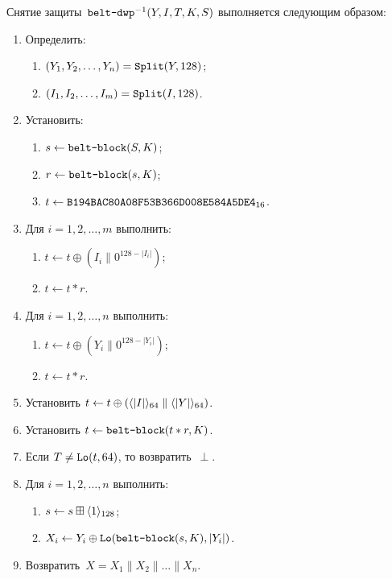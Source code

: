 Снятие защиты~$\texttt{belt-dwp}^{-1}(Y,I,T,K,S)$ выполняется следующим образом:
\begin{enumerate}
\item
Определить: 
\begin{enumerate}
\item
$(Y_1,Y_2,\ldots,Y_n)=\mathop{\texttt{Split}}\nolimits(Y, 128)$;
\item
$(I_1,I_2,\ldots,I_m)=\mathop{\texttt{Split}}\nolimits(I, 128)$. 
\end{enumerate}
\item
Установить:
\begin{enumerate}
\item
$s\leftarrow\texttt{belt-block}(S,K)$;
\item
$r\leftarrow \texttt{belt-block}(s,K)$;
\item
$t\leftarrow\texttt{B194BAC80A08F53B366D008E584A5DE4}_{16}$.
\end{enumerate}

\item
Для $i=1,2,\ldots,m$ выполнить:
\begin{enumerate}
\item
$t\leftarrow t\oplus (I_i\parallel 0^{128-|I_i|})$;
\item
$t\leftarrow t\ast r$.
\end{enumerate}

\item\label{Step.AE.DWP.StepA}
Для $i=1,2,\ldots,n$ выполнить:
\begin{enumerate}
\item
$t\leftarrow t\oplus (Y_i\parallel 0^{128-|Y_i|})$;
\item
$t\leftarrow t\ast r$.
\end{enumerate}

\item
Установить
$t\leftarrow t\oplus 
(\langle|I|\rangle_{64}\parallel\langle|Y|\rangle_{64})$.

\item
Установить
$t\leftarrow \texttt{belt-block}(t\ast r,K)$.

\item\label{Step.AE.DWP.VerifyMAC}
Если $T\neq \mathop{\texttt{Lo}}\nolimits(t, 64)$, то возвратить~$\perp$.

\item\label{Step.AE.DWP.StepD}
Для $i=1,2,\ldots,n$ выполнить:
\begin{enumerate}
\item
$s\leftarrow s\boxplus\langle1\rangle_{128}$;
\item
$X_i\leftarrow Y_i\oplus \mathop{\texttt{Lo}}\nolimits(\texttt{belt-block}(s,K),|Y_i|)$.
\end{enumerate}

\item
Возвратить~$X=X_1\parallel X_2\parallel\ldots\parallel X_n$.
\end{enumerate}

